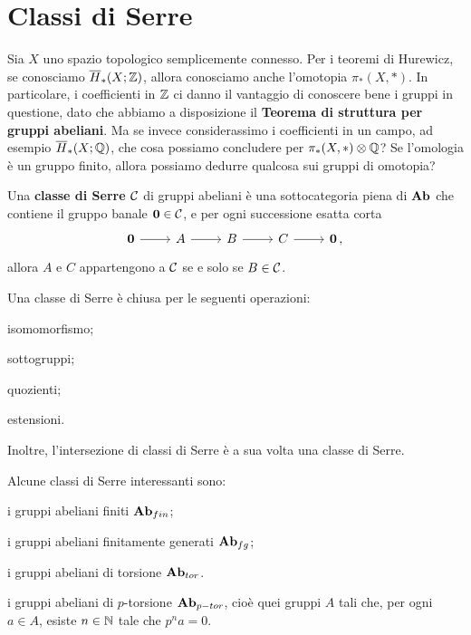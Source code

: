 \section{Classi di Serre}

Sia $X$ uno spazio topologico semplicemente connesso.
Per i teoremi di Hurewicz, se conosciamo $\overline{H}_{*}(X;{\mathbb Z})$,
allora conosciamo anche l'omotopia $\pi_{*}(X,\ast)$.
In particolare, i coefficienti in ${\mathbb Z}$ ci danno il vantaggio di
conoscere bene i gruppi in questione, dato che
abbiamo a disposizione il \textbf{Teorema di struttura per gruppi abeliani}.
Ma se invece considerassimo i coefficienti in un campo,
ad esempio $\overline{H}_{*}(X;{\mathbb Q})$, che cosa possiamo concludere
per $\pi_{*}(X,\ast) \otimes {\mathbb Q}$? Se l'omologia è un gruppo finito, 
allora possiamo dedurre qualcosa sui gruppi di omotopia?

\begin{df}
	Una \textbf{classe di Serre $\mathcal{C}$} di gruppi abeliani
	è una sottocategoria piena di ${\normalfont\textbf{Ab}}$ che contiene il gruppo banale ${\normalfont\textbf{0}} \in \mathcal{C}$,
	e per ogni successione esatta corta
	\begin{equation*}
		\begin{tikzcd}
			\cat{0} \ar[r] & A \ar[r] & B \ar[r] & C \ar[r] & \cat{0}\,,
		\end{tikzcd}
	\end{equation*}
	allora $A$ e $C$ appartengono a $\mathcal{C}$ se e solo se $B \in \mathcal{C}$.
\end{df}

\begin{oss}
	Una classe di Serre è chiusa per le seguenti operazioni:
	\begin{rmnumerate}
		\item isomomorfismo;
		\item sottogruppi;
		\item quozienti;
		\item estensioni.
	\end{rmnumerate}
	Inoltre, l'intersezione di classi di Serre
	è a sua volta una classe di Serre.
\end{oss}

\begin{ex}
 	Alcune classi di Serre interessanti sono:
 	\begin{rmnumerate}
 		\item i gruppi abeliani finiti ${\normalfont\textbf{Ab}}_{fin}$;
 		\item i gruppi abeliani finitamente generati ${\normalfont\textbf{Ab}}_{fg}$;
 		\item i gruppi abeliani di torsione ${\normalfont\textbf{Ab}}_{tor}$.
 		\item i gruppi abeliani di $p$-torsione ${\normalfont\textbf{Ab}}_{p-tor}$,
 		cioè quei gruppi $A$ tali che, per ogni $a \in A$, esiste $n \in {\mathbb N}$
 		tale che $p^{n}a=0$.
 	\end{rmnumerate}
\end{ex}

